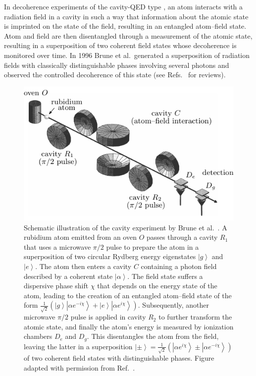 \documentclass[3p,sort&compress,12pt]{elsarticle}
\newcommand{\ket}[1]{\left\vert{#1}\right\rangle}
\newcommand{\E}{\ensuremath{e}}
\newcommand{\I}{\ensuremath{i}}
\begin{document}
In decoherence experiments of the cavity-QED type \cite{Raimond:2001:aa,Haroche:2006:hh}, an atom interacts with a radiation field in a cavity in such a way that information about the atomic state is imprinted on the state of the field, resulting in an entangled atom--field state. Atom and field are then disentangled through a measurement of the atomic state, resulting in a superposition of two coherent field states whose decoherence is monitored over time. In 1996 Brune et al.\ generated a superposition of radiation fields with classically distinguishable phases involving several photons and observed the controlled decoherence of this state \cite{Brune:1996:om,Raimond:2001:aa,Kaiser:2001:tm} (see Refs.~\cite{Raimond:2001:aa,Haroche:2006:hh} for reviews). 

\begin{figure}
\centering
\includegraphics[scale=0.9]{brunesetup2.pdf}
\caption{Schematic illustration of the cavity experiment by Brune et al.\
  \cite{Brune:1996:om}. A rubidium atom emitted from an oven $O$ passes through a cavity $R_1$ that uses a microwave $\pi/2$ pulse to prepare the atom in a superposition of two circular Rydberg energy eigenstates $\ket{g}$ and $\ket{e}$. The atom then enters a cavity $C$ containing a photon field described by a coherent state $\ket{\alpha}$. The field state suffers a dispersive phase shift $\chi$ that depends on the energy state of the atom, leading to the creation of an entangled atom--field state of the form $\frac{1}{\sqrt{2}} \left( \ket{g} \ket{\alpha \E^{-\I \chi} } + \ket{e} \ket{\alpha \E^{\I \chi}} \right)$. Subsequently, another microwave $\pi/2$ pulse is applied in cavity $R_2$ to further transform the atomic state, and finally the atom's energy is measured by ionization chambers $D_e$ and $D_g$. This disentangles the atom from the field, leaving the latter in a superposition $\ket{\pm}=\frac{1}{\sqrt{2}} \left( \ket{\alpha \E^{\I \chi}} \pm \ket{\alpha \E^{-\I \chi}} \right)$ of two coherent field states with distinguishable phases.  Figure adapted with permission from Ref.~\cite{Davidovich:1996:sa}.}
\label{fig:brune-setup}
\end{figure}
\end{document}
